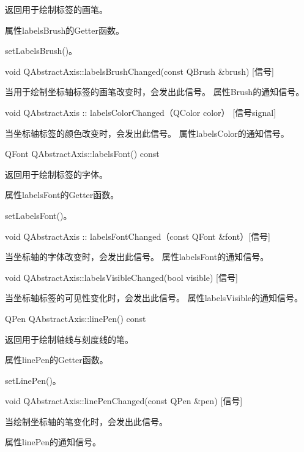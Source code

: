 返回用于绘制标签的画笔。 

\begin{notice}
属性labelsBrush的Getter函数。
\end{notice}

\begin{notice}[另请参阅]
setLabelsBrush()。
\end{notice}


void QAbstractAxis::labelsBrushChanged(const QBrush \&brush) [信号] 

当用于绘制坐标轴标签的画笔改变时，会发出此信号。 属性Brush的通知信号。

void QAbstractAxis :: labelsColorChanged（QColor color） [信号signal] 

当坐标轴标签的颜色改变时，会发出此信号。 属性labelsColor的通知信号。

QFont QAbstractAxis::labelsFont() const 

返回用于绘制标签的字体。 

\begin{notice}
属性labelsFont的Getter函数。
\end{notice}

\begin{notice}[另请参阅]
setLabelsFont()。
\end{notice}

void QAbstractAxis :: labelsFontChanged（const QFont \&font）[信号] 

当坐标轴的字体改变时，会发出此信号。 属性labelsFont的通知信号。

void QAbstractAxis::labelsVisibleChanged(bool visible) [信号] 

当坐标轴标签的可见性变化时，会发出此信号。 属性labelsVisible的通知信号。

QPen QAbstractAxis::linePen() const 

返回用于绘制轴线与刻度线的笔。 

\begin{notice}
属性linePen的Getter函数。
\end{notice}

\begin{notice}[另请参阅]
setLinePen()。
\end{notice}

void QAbstractAxis::linePenChanged(const QPen \&pen) [信号] 

当绘制坐标轴的笔变化时，会发出此信号。 

\begin{notice}
属性linePen的通知信号。
\end{notice}

